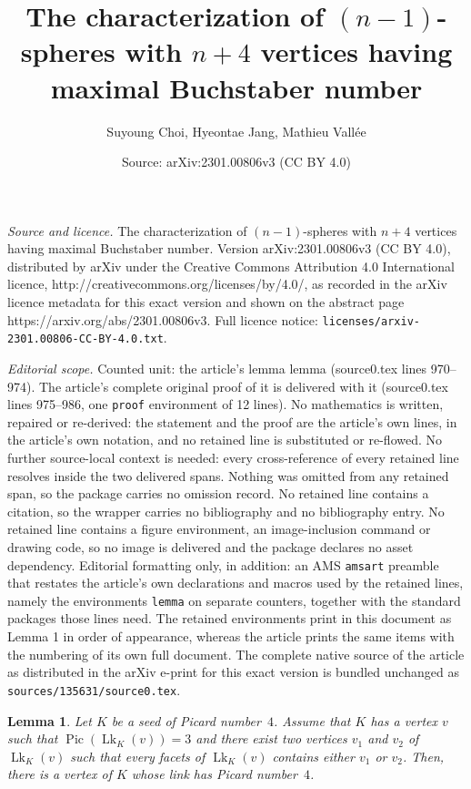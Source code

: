 \documentclass[10pt,a4paper]{amsart}
\title{The characterization of $(n-1)$-spheres with $n+4$ vertices having maximal Buchstaber number}
\author{Suyoung Choi, Hyeontae Jang, Mathieu Vall\'ee}
\date{Source: arXiv:2301.00806v3 (CC BY 4.0)}
\newtheorem{lemma}{Lemma}
\DeclareMathOperator{\Lk}{Lk}
\DeclareMathOperator{\Pic}{Pic}
\begin{document}
\maketitle

\noindent\emph{Source and licence.} The characterization of $(n-1)$-spheres with $n+4$ vertices having maximal Buchstaber number. Version arXiv:2301.00806v3 (CC BY 4.0), distributed by arXiv under the Creative Commons Attribution 4.0 International licence, http://creativecommons.org/licenses/by/4.0/, as recorded in the arXiv licence metadata for this exact version and shown on the abstract page https://arxiv.org/abs/2301.00806v3. Full licence notice: \texttt{licenses/arxiv-2301.00806-CC-BY-4.0.txt}.\par\smallskip

\noindent\textit{Editorial scope.} Counted unit: the article's lemma lemma (source0.tex lines 970--974). The article's complete original proof of it is delivered with it (source0.tex lines 975--986, one \texttt{proof} environment of 12 lines). No mathematics is written, repaired or re-derived: the statement and the proof are the article's own lines, in the article's own notation, and no retained line is substituted or re-flowed.  No further source-local context is needed: every cross-reference of every retained line resolves inside the two delivered spans.  Nothing was omitted from any retained span, so the package carries no omission record.  No retained line contains a citation, so the wrapper carries no bibliography and no bibliography entry.  No retained line contains a figure environment, an image-inclusion command or drawing code, so no image is delivered and the package declares no asset dependency.  Editorial formatting only, in addition: an AMS \texttt{amsart} preamble that restates the article's own declarations and macros used by the retained lines, namely the environments \texttt{lemma} on separate counters, together with the standard packages those lines need.  The retained environments print in this document as Lemma 1 in order of appearance, whereas the article prints the same items with the numbering of its own full document.  The complete native source of the article as distributed in the arXiv e-print for this exact version is bundled unchanged as \texttt{sources/135631/source0.tex}.
\begin{lemma}
	Let $K$ be a seed of Picard number~$4$.
	Assume that $K$ has a vertex $v$ such that $\Pic(\Lk_K(v)) = 3$ and there exist two vertices $v_1$ and $v_2$ of $\Lk_K(v)$ such that every facets of $\Lk_K(v)$ contains either $v_1$ or $v_2$.
	Then, there is a vertex of $K$ whose link has Picard number~$4$.
\end{lemma}
\end{document}

